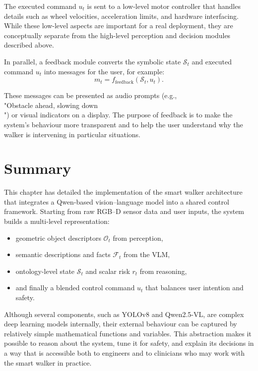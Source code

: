 \documentclass{article}
\begin{document}
The executed command $u_t$ is sent to a low-level motor controller that handles details such as wheel velocities, acceleration limits, and hardware interfacing. While these low-level aspects are important for a real deployment, they are conceptually separate from the high-level perception and decision modules described above.

In parallel, a feedback module converts the symbolic state $\mathcal{S}_t$ and executed command $u_t$ into messages for the user, for example:
\begin{equation}
    m_t = f_{\text{feedback}}(\mathcal{S}_t, u_t).
\end{equation}

These messages can be presented as audio prompts (e.g., \\"Obstacle ahead, slowing down\\") or visual indicators on a display. The purpose of feedback is to make the system's behaviour more transparent and to help the user understand why the walker is intervening in particular situations.

\section{Summary}

This chapter has detailed the implementation of the smart walker architecture that integrates a Qwen-based vision--language model into a shared control framework. Starting from raw RGB--D sensor data and user inputs, the system builds a multi-level representation:
\begin{itemize}
    \item geometric object descriptors $\mathcal{O}_t$ from perception,
    \item semantic descriptions and facts $\mathcal{F}_t$ from the VLM,
    \item ontology-level state $\mathcal{S}_t$ and scalar risk $r_t$ from reasoning,
    \item and finally a blended control command $u_t$ that balances user intention and safety.
\end{itemize}

Although several components, such as YOLOv8 and Qwen2.5-VL, are complex deep learning models internally, their external behaviour can be captured by relatively simple mathematical functions and variables. This abstraction makes it possible to reason about the system, tune it for safety, and explain its decisions in a way that is accessible both to engineers and to clinicians who may work with the smart walker in practice.
\end{document}
